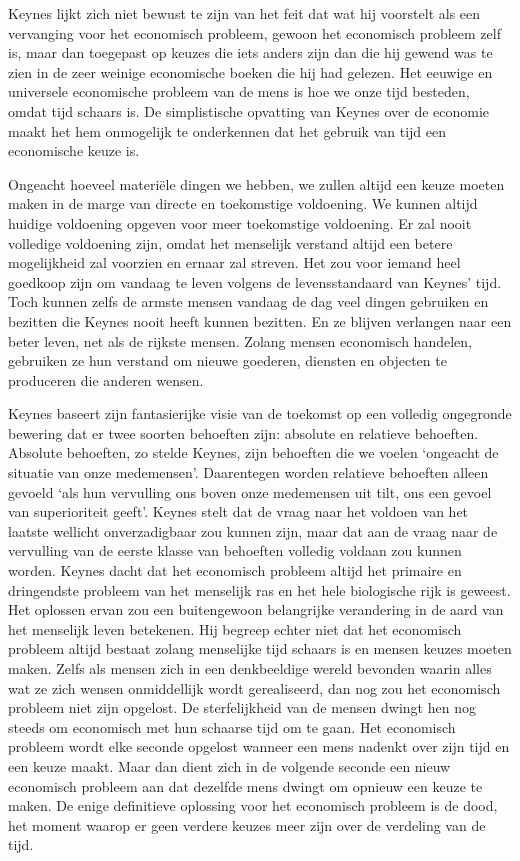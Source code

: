 Keynes lijkt zich niet bewust te zijn van het feit dat wat hij voorstelt
als een vervanging voor het economisch probleem, gewoon het economisch
probleem zelf is, maar dan toegepast op keuzes die iets anders zijn dan
die hij gewend was te zien in de zeer weinige economische boeken die hij
had gelezen. Het eeuwige en universele economische probleem van de mens
is hoe we onze tijd besteden, omdat tijd schaars is. De simplistische
opvatting van Keynes over de economie maakt het hem onmogelijk te
onderkennen dat het gebruik van tijd een economische keuze is.

Ongeacht hoeveel materiële dingen we hebben, we zullen altijd een keuze
moeten maken in de marge van directe en toekomstige voldoening. We
kunnen altijd huidige voldoening opgeven voor meer toekomstige
voldoening. Er zal nooit volledige voldoening zijn, omdat het menselijk
verstand altijd een betere mogelijkheid zal voorzien en ernaar zal
streven. Het zou voor iemand heel goedkoop zijn om vandaag te leven
volgens de levensstandaard van Keynes' tijd. Toch
kunnen zelfs de armste mensen vandaag de dag veel dingen gebruiken en
bezitten die Keynes nooit heeft kunnen bezitten. En ze blijven verlangen
naar een beter leven, net als de rijkste mensen. Zolang mensen
economisch handelen, gebruiken ze hun verstand om nieuwe goederen,
diensten en objecten te produceren die anderen wensen.

Keynes baseert zijn fantasierijke visie van de toekomst op een volledig
ongegronde bewering dat er twee soorten behoeften zijn: absolute en
relatieve behoeften. Absolute behoeften, zo stelde Keynes, zijn
behoeften die we voelen `ongeacht de situatie van onze medemensen'.
Daarentegen worden relatieve behoeften alleen gevoeld `als hun
vervulling ons boven onze medemensen uit tilt, ons een gevoel van
superioriteit geeft'.\autocite{46} Keynes stelt dat de vraag naar het voldoen 
van het laatste wellicht onverzadigbaar zou kunnen zijn, maar dat aan de vraag 
naar de vervulling van de eerste klasse van behoeften volledig voldaan zou 
kunnen worden. Keynes dacht dat het economisch probleem altijd het primaire en
dringendste probleem van het menselijk ras en het hele biologische rijk
is geweest. Het oplossen ervan zou een buitengewoon belangrijke
verandering in de aard van het menselijk leven betekenen. Hij begreep
echter niet dat het economisch probleem altijd bestaat zolang menselijke
tijd schaars is en mensen keuzes moeten maken. Zelfs als mensen zich in
een denkbeeldige wereld bevonden waarin alles wat ze zich wensen
onmiddellijk wordt gerealiseerd, dan nog zou het economisch probleem
niet zijn opgelost. De sterfelijkheid van de mensen dwingt hen nog
steeds om economisch met hun schaarse tijd om te gaan. Het economisch
probleem wordt elke seconde opgelost wanneer een mens nadenkt over zijn
tijd en een keuze maakt. Maar dan dient zich in de volgende seconde een
nieuw economisch probleem aan dat dezelfde mens dwingt om opnieuw een
keuze te maken. De enige definitieve oplossing voor het economisch
probleem is de dood, het moment waarop er geen verdere keuzes meer zijn
over de verdeling van de tijd.

